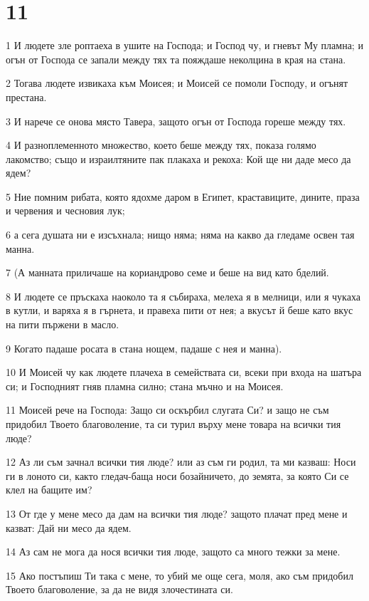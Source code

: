 \chapter{11}

\par 1 И людете зле роптаеха в ушите на Господа; и Господ чу, и гневът Му пламна; и огън от Господа се запали между тях та пояждаше неколцина в края на стана.
\par 2 Тогава людете извикаха към Моисея; и Моисей се помоли Господу, и огънят престана.
\par 3 И нарече се онова място Тавера, защото огън от Господа гореше между тях.
\par 4 И разноплеменното множество, което беше между тях, показа голямо лакомство; също и израилтяните пак плакаха и рекоха: Кой ще ни даде месо да ядем?
\par 5 Ние помним рибата, която ядохме даром в Египет, краставиците, дините, праза и червения и чесновия лук;
\par 6 а сега душата ни е изсъхнала; нищо няма; няма на какво да гледаме освен тая манна.
\par 7 (А манната приличаше на кориандрово семе и беше на вид като бделий.
\par 8 И людете се пръскаха наоколо та я събираха, мелеха я в мелници, или я чукаха в кутли, и варяха я в гърнета, и правеха пити от нея; а вкусът й беше като вкус на пити пържени в масло.
\par 9 Когато падаше росата в стана нощем, падаше с нея и манна).
\par 10 И Моисей чу как людете плачеха в семействата си, всеки при входа на шатъра си; и Господният гняв пламна силно; стана мъчно и на Моисея.
\par 11 Моисей рече на Господа: Защо си оскърбил слугата Си? и защо не съм придобил Твоето благоволение, та си турил върху мене товара на всички тия люде?
\par 12 Аз ли съм зачнал всички тия люде? или аз съм ги родил, та ми казваш: Носи ги в лоното си, както гледач-баща носи бозайничето, до земята, за която Си се клел на бащите им?
\par 13 От где у мене месо да дам на всички тия люде? защото плачат пред мене и казват: Дай ни месо да ядем.
\par 14 Аз сам не мога да нося всички тия люде, защото са много тежки за мене.
\par 15 Ако постъпиш Ти така с мене, то убий ме още сега, моля, ако съм придобил Твоето благоволение, за да не видя злочестината си.
